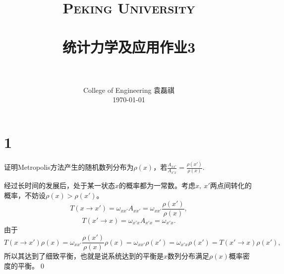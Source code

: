 \documentclass[12pt]{article}
\title{
		\vspace{-1in} 	
		\usefont{OT1}{bch}{b}{n}
		\normalfont \normalsize \textsc{\LARGE Peking University}\\[1cm] %
		\horrule{0.5pt} \\[0.5cm]
		\huge \bfseries{统计力学及应用作业3} \\
		\horrule{2pt} \\[0.5cm]
}
\author{
		\normalfont 								\normalsize
		College of Engineering \quad 2001111690  \quad 袁磊祺\\	\normalsize
        \today
}
\date{}
\begin{document}


\maketitle

\section{1}

证明Metropolis方法产生的随机数列分布为$\rho(x)$，若$\frac{A_{xx'}}{A_{x'x}}=\frac{\rho (x')}{\rho (x)}$.

经过长时间的发展后，处于某一状态$x$的概率都为一常数。考虑$x,\ x'$两点间转化的概率，不妨设$\rho(x)>\rho(x')$。
\begin{equation}
	T(x\to x') = \omega_{xx'} A_{xx'} = \omega_{xx'} \frac{\rho (x')}{\rho (x)},
\end{equation}
\begin{equation}
	T(x'\to x) = \omega_{x'x} A_{x'x} = \omega_{x'x}.
\end{equation}
由于
\begin{equation}
	T(x\to x')\rho (x) = \omega_{xx'} \frac{\rho (x')}{\rho (x)} \rho (x) = \omega_{xx'}\rho (x') = \omega_{x'x}\rho (x') = T(x'\to x)\rho (x'),
\end{equation}
所以其达到了细致平衡，也就是说系统达到的平衡是$x$数列分布满足$\rho(x)$概率密度的平衡。\qed










\end{document}

